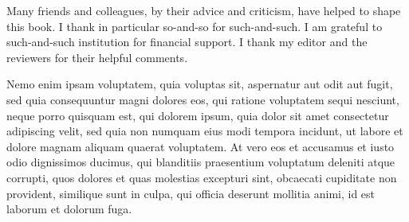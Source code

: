 
Many friends and colleagues, by their advice and criticism, have helped to shape this book. I thank in particular so-and-so for such-and-such. I am grateful to such-and-such institution for financial support. I thank my editor and the reviewers for their helpful comments.

Nemo enim ipsam voluptatem, quia voluptas sit, aspernatur aut odit aut fugit, sed quia consequuntur magni dolores eos, qui ratione voluptatem sequi nesciunt, neque porro quisquam est, qui dolorem ipsum, quia dolor sit amet consectetur adipiscing velit, sed quia non numquam eius modi tempora incidunt, ut labore et dolore magnam aliquam quaerat voluptatem. At vero eos et accusamus et iusto odio dignissimos ducimus, qui blanditiis praesentium voluptatum deleniti atque corrupti, quos dolores et quas molestias excepturi sint, obcaecati cupiditate non provident, similique sunt in culpa, qui officia deserunt mollitia animi, id est laborum et dolorum fuga.
